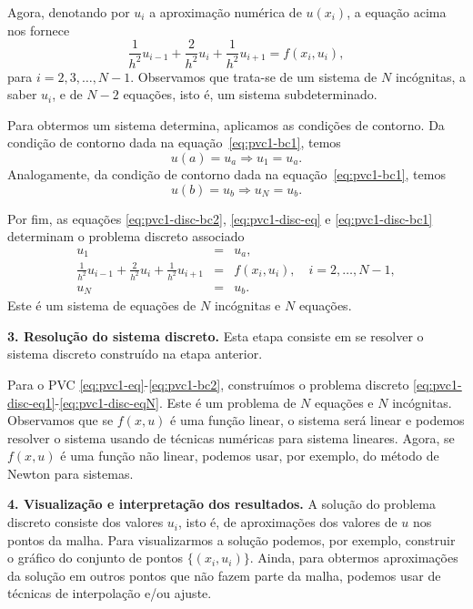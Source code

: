 Agora, denotando por $u_i$ a aproximação numérica de $u(x_i)$, a equação acima nos fornece
\begin{equation}\label{eq:pvc1-disc-eq}
\frac{1}{h^2}u_{i-1} + \frac{2}{h^2}u_i + \frac{1}{h^2}u_{i+1} = f(x_i, u_i),
\end{equation}
para $i=2, 3, \dotsc, N-1$. Observamos que trata-se de um sistema de $N$ incógnitas, a saber $u_i$, e de $N-2$ equações, isto é, um sistema subdeterminado.

Para obtermos um sistema determina, aplicamos as condições de contorno. Da condição de contorno dada na equação~\eqref{eq:pvc1-bc1}, temos
\begin{equation}\label{eq:pvc1-disc-bc1}
  u(a) = u_a\Rightarrow u_1 = u_a.
\end{equation}
Analogamente, da condição de contorno dada na equação~\eqref{eq:pvc1-bc1}, temos
\begin{equation}\label{eq:pvc1-disc-bc2}
  u(b) = u_b\Rightarrow u_N = u_b.
\end{equation}

Por fim, as equações \eqref{eq:pvc1-disc-bc2}, \eqref{eq:pvc1-disc-eq} e \eqref{eq:pvc1-disc-bc1} determinam o problema discreto associado
\begin{eqnarray}
  u_1 &=& u_a,\label{eq:pvc1-disc-eq1}\\
  \frac{1}{h^2}u_{i-1} + \frac{2}{h^2}u_i + \frac{1}{h^2}u_{i+1} &=& f(x_i, u_i),\quad i=2, \dotsc, N-1,\label{eq:pvc1-disc-eqi}\\
  u_N &=& u_b.\label{eq:pvc1-disc-eqN}
\end{eqnarray}
Este é um sistema de equações de $N$ incógnitas e $N$ equações.

{\bf 3. Resolução do sistema discreto.} Esta etapa consiste em se resolver o sistema discreto construído na etapa anterior. 

Para o PVC \eqref{eq:pvc1-eq}-\eqref{eq:pvc1-bc2}, construímos o problema discreto \eqref{eq:pvc1-disc-eq1}-\eqref{eq:pvc1-disc-eqN}. Este é um problema de $N$ equações e $N$ incógnitas. Observamos que se $f(x, u)$ é uma função linear, o sistema será linear e podemos resolver o sistema usando de técnicas numéricas para sistema lineares. Agora, se $f(x, u)$ é uma função não linear, podemos usar, por exemplo, do método de Newton para sistemas.

{\bf 4. Visualização e interpretação dos resultados.} A solução do problema discreto consiste dos valores $u_i$, isto é, de aproximações dos valores de $u$ nos pontos da malha. Para visualizarmos a solução podemos, por exemplo, construir o gráfico do conjunto de pontos $\{(x_i, u_i)\}$. Ainda, para obtermos aproximações da solução em outros pontos que não fazem parte da malha, podemos usar de técnicas de interpolação e/ou ajuste.

